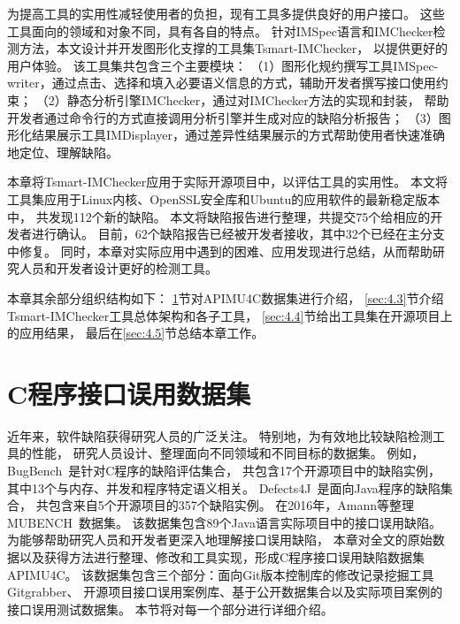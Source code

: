 为提高工具的实用性减轻使用者的负担，现有工具多提供良好的用户接口。
这些工具面向的领域和对象不同，具有各自的特点。
针对IMSpec语言和IMChecker检测方法，本文设计并开发图形化支撑的工具集Tsmart-IMChecker，
以提供更好的用户体验。
该工具集共包含三个主要模块：
（1）图形化规约撰写工具IMSpec-writer，通过点击、选择和填入必要语义信息的方式，辅助开发者撰写接口使用约束；
（2）静态分析引擎IMChecker，通过对IMChecker方法的实现和封装，
帮助开发者通过命令行的方式直接调用分析引擎并生成对应的缺陷分析报告；
（3）图形化结果展示工具IMDisplayer，通过差异性结果展示的方式帮助使用者快速准确地定位、理解缺陷。

本章将Tsmart-IMChecker应用于实际开源项目中，以评估工具的实用性。
本文将工具集应用于Linux内核、OpenSSL安全库和Ubuntu的应用软件的最新稳定版本中，
共发现112个新的缺陷。
本文将缺陷报告进行整理，共提交75个给相应的开发者进行确认。
目前，62个缺陷报告已经被开发者接收，其中32个已经在主分支中修复。
同时，本章对实际应用中遇到的困难、应用发现进行总结，从而帮助研究人员和开发者设计更好的检测工具。



本章其余部分组织结构如下：
\ref{sec:4.2}节对APIMU4C数据集进行介绍，
\ref{sec:4.3}节介绍Tsmart-IMChecker工具总体架构和各子工具，
\ref{sec:4.4}节给出工具集在开源项目上的应用结果，
最后在\ref{sec:4.5}节总结本章工作。

\section{C程序接口误用数据集}
\label{sec:4.2}
近年来，软件缺陷获得研究人员的广泛关注。
特别地，为有效地比较缺陷检测工具的性能，
研究人员设计、整理面向不同领域和不同目标的数据集。
例如，BugBench~\cite{05-bugbench}是针对C程序的缺陷评估集合，
共包含17个开源项目中的缺陷实例，
其中13个与内存、并发和程序特定语义相关。
Defects4J~\cite{14-issta-defects4j}是面向Java程序的缺陷集合，
共包含来自5个开源项目的357个缺陷实例。
在2016年，Amann等整理MUBENCH~\cite{16-msr-mubench}数据集。
该数据集包含89个Java语言实际项目中的接口误用缺陷。
为能够帮助研究人员和开发者更深入地理解接口误用缺陷，
本章对全文的原始数据以及获得方法进行整理、修改和工具实现，形成C程序接口误用缺陷数据集APIMU4C。
该数据集包含三个部分：面向Git版本控制库的修改记录挖掘工具Gitgrabber、
开源项目接口误用案例库、基于公开数据集合以及实际项目案例的接口误用测试数据集。
本节将对每一个部分进行详细介绍。

